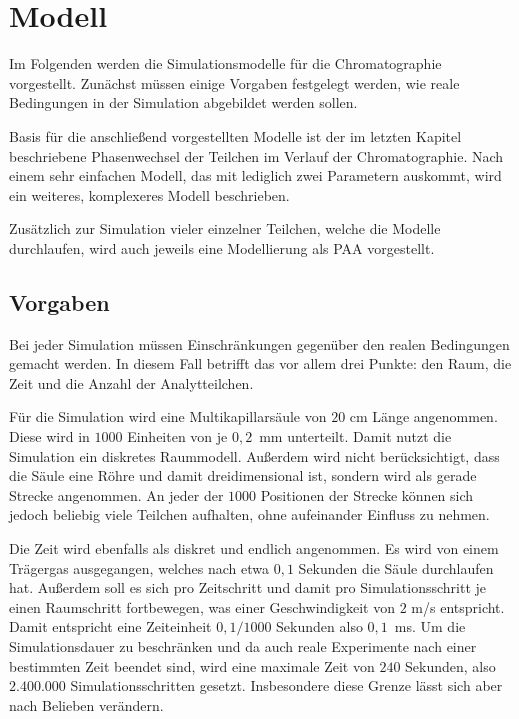 \chapter{Modell} %
\label{chapter:mod}
Im Folgenden werden die Simulationsmodelle für die Chromatographie vorgestellt. 
Zunächst müssen einige Vorgaben festgelegt werden, wie reale Bedingungen in der Simulation abgebildet werden sollen.

Basis für die anschließend vorgestellten Modelle ist der im letzten Kapitel beschriebene Phasenwechsel der Teilchen im Verlauf der Chromatographie. Nach einem sehr einfachen Modell, das mit lediglich zwei Parametern auskommt, wird ein weiteres, komplexeres Modell beschrieben.

Zusätzlich zur Simulation vieler einzelner Teilchen, welche die Modelle durchlaufen, wird auch jeweils eine Modellierung als PAA vorgestellt.

\section{Vorgaben}
Bei jeder Simulation müssen Einschränkungen gegenüber den realen Bedingungen gemacht werden. In diesem Fall betrifft das vor allem drei Punkte: den Raum, die Zeit und die Anzahl der Analytteilchen.

Für die Simulation wird eine Multikapillarsäule von $20$ cm Länge angenommen. Diese wird in $1000$ Einheiten von je $0,2$\, mm unterteilt. Damit nutzt die Simulation ein diskretes Raummodell. Außerdem wird nicht berücksichtigt, dass die Säule eine Röhre und damit dreidimensional ist, sondern wird als gerade Strecke angenommen. An jeder der $1000$ Positionen der Strecke können sich jedoch beliebig viele Teilchen aufhalten, ohne aufeinander Einfluss zu nehmen.

Die Zeit wird ebenfalls als diskret und endlich angenommen. Es wird von einem Trägergas ausgegangen, welches nach etwa $0,1$ Sekunden die Säule durchlaufen hat. Außerdem soll es sich pro Zeitschritt und damit pro Simulationsschritt je einen Raumschritt fortbewegen, was einer Geschwindigkeit von $2$ m/s entspricht. Damit entspricht eine Zeiteinheit $0,1/1000$ Sekunden also $0,1$\, ms. Um die Simulationsdauer zu beschränken und da auch reale Experimente nach einer bestimmten Zeit beendet sind, wird eine maximale Zeit von $240$ Sekunden, also $2.400.000$ Simulationsschritten gesetzt. Insbesondere diese Grenze lässt sich aber nach Belieben verändern.

